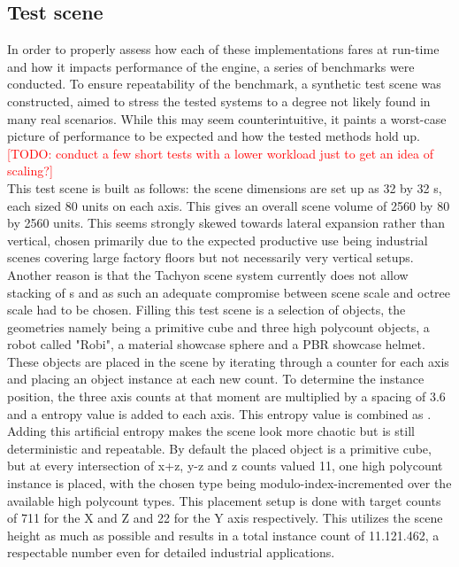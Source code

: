 \subsection{Test scene}
In order to properly assess how each of these implementations fares at run-time and how it impacts performance of the engine, a series of benchmarks were conducted. To ensure repeatability of the benchmark, a synthetic test scene was constructed, aimed to stress the tested systems to a degree not likely found in many real scenarios. While this may seem counterintuitive, it paints a worst-case picture of performance to be expected and how the tested methods hold up. \textcolor{red}{[TODO: conduct a few short tests with a lower workload just to get an idea of scaling?]} \\
This test scene is built as follows: the scene dimensions are set up as 32 by 32 s, each  sized 80 units on each axis. This gives an overall scene volume of 2560 by 80 by 2560 units. This seems strongly skewed towards lateral expansion rather than vertical, chosen primarily due to the expected productive use being industrial scenes covering large factory floors but not necessarily very vertical setups. Another reason is that the Tachyon scene  system currently does not allow stacking of s and as such an adequate compromise between scene scale and octree scale had to be chosen. 
Filling this test scene is a selection of objects, the geometries namely being a primitive cube and three high polycount objects, a robot called "Robi", a material showcase sphere and a PBR showcase helmet. These objects are placed in the scene by iterating through a counter for each axis and placing an object instance at each new count. To determine the instance position, the three axis counts at that moment are multiplied by a spacing of 3.6 and a entropy value is added to each axis. This entropy value is combined as . Adding this artificial entropy makes the scene look more chaotic but is still deterministic and repeatable.
By default the placed object is a primitive cube, but at every intersection of x+z, y-z and z counts valued 11, one high polycount instance is placed, with the chosen type being modulo-index-incremented over the available high polycount types. 
This placement setup is done with target counts of 711 for the X and Z and 22 for the Y axis respectively. This utilizes the scene height as much as possible and results in a total instance count of 11.121.462, a respectable number even for detailed industrial applications. \\
